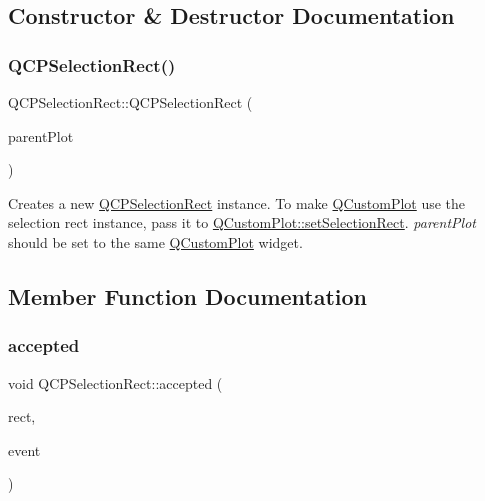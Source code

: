 \subsection{Constructor \& Destructor Documentation}
\mbox{\label{class_q_c_p_selection_rect_ade6ee59fabcc585a1e281eb527b01867}} 
\subsubsection{\texorpdfstring{Q\+C\+P\+Selection\+Rect()}{QCPSelectionRect()}}
{\footnotesize\ttfamily Q\+C\+P\+Selection\+Rect\+::\+Q\+C\+P\+Selection\+Rect (\begin{DoxyParamCaption}\item[{\hyperlink{class_q_custom_plot}{Q\+Custom\+Plot} $\ast$}]{parent\+Plot }\end{DoxyParamCaption})\hspace{0.3cm}{\ttfamily [explicit]}}

Creates a new \hyperlink{class_q_c_p_selection_rect}{Q\+C\+P\+Selection\+Rect} instance. To make \hyperlink{class_q_custom_plot}{Q\+Custom\+Plot} use the selection rect instance, pass it to \hyperlink{class_q_custom_plot_a0c09f96df15faa4799ad7051bb16cf33}{Q\+Custom\+Plot\+::set\+Selection\+Rect}. {\itshape parent\+Plot} should be set to the same \hyperlink{class_q_custom_plot}{Q\+Custom\+Plot} widget. 

\subsection{Member Function Documentation}
\mbox{\label{class_q_c_p_selection_rect_a15a43542e1f7b953a44c260b419e6d2c}} 
\subsubsection{\texorpdfstring{accepted}{accepted}}
{\footnotesize\ttfamily void Q\+C\+P\+Selection\+Rect\+::accepted (\begin{DoxyParamCaption}\item[{const Q\+Rect \&}]{rect,  }\item[{Q\+Mouse\+Event $\ast$}]{event }\end{DoxyParamCaption})\hspace{0.3cm}{\ttfamily [signal]}}


